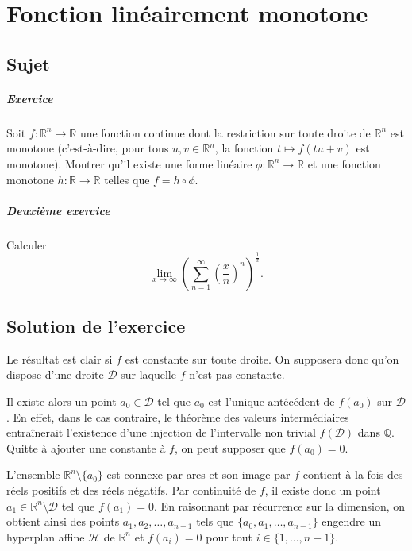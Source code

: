 \chapter{Fonction linéairement monotone} 

\section{Sujet}

\paragraph{Exercice}
Soit $f : \mathbb R^n \to \mathbb R$ une fonction continue dont la restriction sur toute droite de $\mathbb R^n$ est monotone (c'est-à-dire, pour tous $u,v \in \mathbb R^n$, la fonction $t\mapsto f(tu+v)$ est monotone).
Montrer qu'il existe une forme linéaire $\phi : \mathbb R^n \to \mathbb R$ et une fonction monotone $h : \mathbb R \to \mathbb R$ telles que $f = h \circ \phi$.

\paragraph{Deuxième exercice}
Calculer
\[
\lim_{x\to\infty} \left(\sum_{n=1}^\infty \left(\frac xn\right)^n\right)^{\frac1x}.
\]

\section{Solution de l'exercice}

Le résultat est clair si $f$ est constante sur toute droite.
On supposera donc qu'on dispose d'une droite $\mathcal D$ sur laquelle $f$ n'est pas constante.

Il existe alors un point $a_0 \in \mathcal D$ tel que $a_0$ est l'unique antécédent de $f(a_0)$ sur $\mathcal D$. En effet, dans le cas contraire, le théorème des valeurs intermédiaires entraînerait l'existence d'une injection de l'intervalle non trivial $f(\mathcal D)$ dans $\mathbb Q$.
Quitte à ajouter une constante à $f$, on peut supposer que $f(a_0)=0$.

L'ensemble $\mathbb R^n \setminus\{a_0\}$ est connexe par arcs et son image par $f$ contient à la fois des réels positifs et des réels négatifs.
Par continuité de $f$, il existe donc un point $a_1 \in \mathbb R^n \setminus \mathcal D$ tel que $f(a_1) = 0$.
En raisonnant par récurrence sur la dimension, on obtient ainsi des points $a_1,a_2,\dots,a_{n-1}$ tels que $\{a_0,a_1,\dots,a_{n-1}\}$ engendre un hyperplan affine $\mathcal H$ de $\mathbb R^n$ et $f(a_i) = 0$ pour tout $i\in \{1,\dots,n-1\}$.

